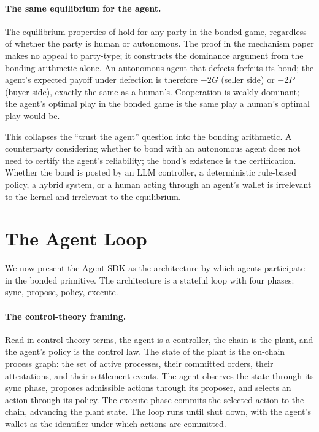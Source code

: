 \documentclass[11pt,a4paper]{article}
\theoremstyle{definition}
\theoremstyle{remark}
\newcommand{\pay}{P}
\newcommand{\cumval}{G}
\begin{document}
\paragraph{The same equilibrium for the agent.}
The equilibrium properties of  hold for any
party in the bonded game, regardless of whether the party is human
or autonomous. The proof in the mechanism paper makes no appeal to
party-type; it constructs the dominance argument from the bonding
arithmetic alone. An autonomous agent that defects forfeits its
bond; the agent's expected payoff under defection is therefore
$-2\cumval$ (seller side) or $-2\pay$ (buyer side), exactly the
same as a human's. Cooperation is weakly dominant; the agent's
optimal play in the bonded game is the same play a human's optimal
play would be.

This collapses the ``trust the agent'' question into the bonding
arithmetic. A counterparty considering whether to bond with an
autonomous agent does not need to certify the agent's reliability;
the bond's existence is the certification. Whether the bond is
posted by an LLM controller, a deterministic rule-based policy, a
hybrid system, or a human acting through an agent's wallet is
irrelevant to the kernel and irrelevant to the equilibrium.

\section{The Agent Loop}
\label{sec:loop}

We now present the Agent SDK as the architecture by which agents
participate in the bonded primitive. The architecture is a
stateful loop with four phases: sync, propose, policy, execute.

\paragraph{The control-theory framing.}
Read in control-theory terms, the agent is a controller, the
chain is the plant, and the agent's policy is the control law.
The state of the plant is the on-chain process graph: the set of
active processes, their committed orders, their attestations, and
their settlement events. The agent observes the state through its
sync phase, proposes admissible actions through its proposer, and
selects an action through its policy. The execute phase commits
the selected action to the chain, advancing the plant state. The
loop runs until shut down, with the agent's wallet as the
identifier under which actions are committed.
\end{document}
